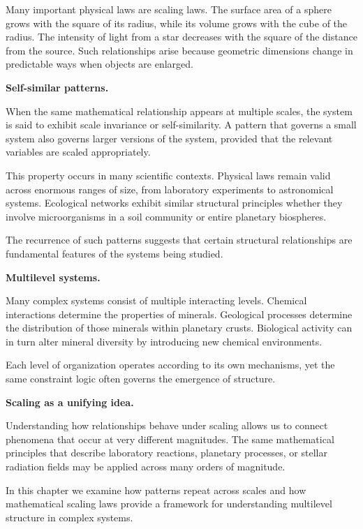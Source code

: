 \documentclass[11pt, openany]{book}
\theoremstyle{plain}
\theoremstyle{definition}
\theoremstyle{remark}
\begin{document}
Many important physical laws are scaling laws. The surface area of a
sphere grows with the square of its radius, while its volume grows with
the cube of the radius. The intensity of light from a star decreases
with the square of the distance from the source. Such relationships
arise because geometric dimensions change in predictable ways when
objects are enlarged.

\medskip

\textbf{Self-similar patterns.}

When the same mathematical relationship appears at multiple scales, the
system is said to exhibit scale invariance or self-similarity. A pattern
that governs a small system also governs larger versions of the system,
provided that the relevant variables are scaled appropriately.

This property occurs in many scientific contexts. Physical laws remain
valid across enormous ranges of size, from laboratory experiments to
astronomical systems. Ecological networks exhibit similar structural
principles whether they involve microorganisms in a soil community or
entire planetary biospheres.

The recurrence of such patterns suggests that certain structural
relationships are fundamental features of the systems being studied.

\medskip

\textbf{Multilevel systems.}

Many complex systems consist of multiple interacting levels. Chemical
interactions determine the properties of minerals. Geological processes
determine the distribution of those minerals within planetary crusts.
Biological activity can in turn alter mineral diversity by introducing
new chemical environments.

Each level of organization operates according to its own mechanisms, yet
the same constraint logic often governs the emergence of structure.

\medskip

\textbf{Scaling as a unifying idea.}

Understanding how relationships behave under scaling allows us to
connect phenomena that occur at very different magnitudes. The same
mathematical principles that describe laboratory reactions, planetary
processes, or stellar radiation fields may be applied across many orders
of magnitude.

In this chapter we examine how patterns repeat across scales and how
mathematical scaling laws provide a framework for understanding
multilevel structure in complex systems.
\end{document}
